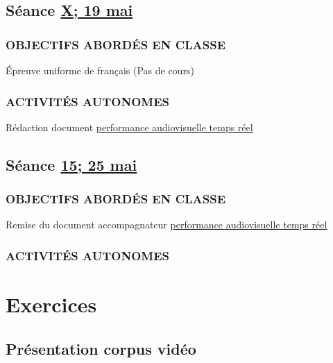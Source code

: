 \documentclass[
  french,
]{book}
\begin{document}
\hypertarget{semaine_17}{%
\section{\texorpdfstring{Séance \protect\hyperlink{semaine_17}{X; 19 mai}}{Séance X; 19 mai}}\label{semaine_17}}

\hypertarget{objectifs-aborduxe9s-en-classe-16}{%
\subsection{OBJECTIFS ABORDÉS EN CLASSE}\label{objectifs-aborduxe9s-en-classe-16}}

Épreuve uniforme de français (Pas de cours)

\hypertarget{activituxe9s-autonomes-16}{%
\subsection{ACTIVITÉS AUTONOMES}\label{activituxe9s-autonomes-16}}

Rédaction document \protect\hyperlink{sommatif_5}{performance audiovisuelle temps réel}

\hypertarget{semaine_18}{%
\section{\texorpdfstring{Séance \protect\hyperlink{semaine_18}{15; 25 mai}}{Séance 15; 25 mai}}\label{semaine_18}}

\hypertarget{objectifs-aborduxe9s-en-classe-17}{%
\subsection{OBJECTIFS ABORDÉS EN CLASSE}\label{objectifs-aborduxe9s-en-classe-17}}

Remise du document accompagnateur \protect\hyperlink{sommatif_5}{performance audiovisuelle temps réel}

\hypertarget{activituxe9s-autonomes-17}{%
\subsection{ACTIVITÉS AUTONOMES}\label{activituxe9s-autonomes-17}}

\hypertarget{exercices}{%
\chapter{Exercices}\label{exercices}}

\hypertarget{sommatif_1}{%
\section{Présentation corpus vidéo}\label{sommatif_1}}
\end{document}
